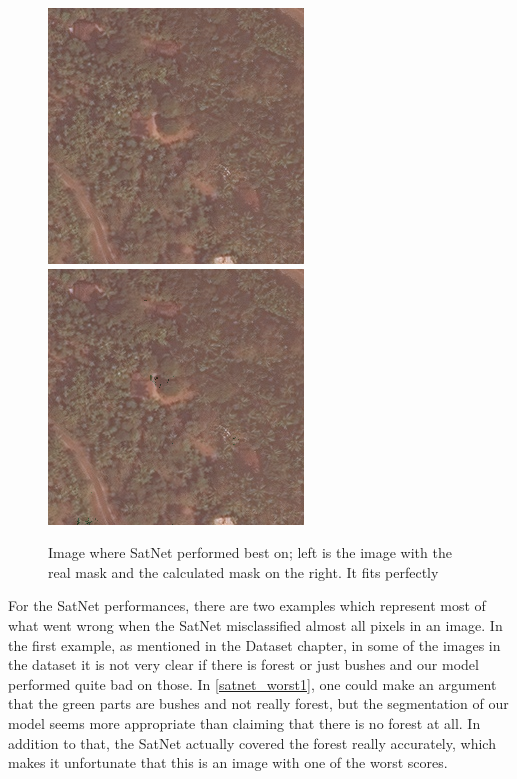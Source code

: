 \begin{figure}[!h]
  \begin{center}
  \label{satnet_best}
  \includegraphics[width=.4\linewidth]{images/satellite_images/sat_best_real}
  \includegraphics[width=.4\linewidth]{images/satellite_images/sat_best_calc}
  \caption{Image where SatNet performed best on; left is the image with the real mask and the calculated mask on the right. It fits perfectly}
  \end{center}
\end{figure}

For the SatNet performances, there are two examples which represent most of what went wrong when the SatNet misclassified almost all pixels in an image. In the first example, as mentioned in the Dataset chapter, in some of the images in the dataset it is not very clear if there is forest or just bushes and our model performed quite bad on those. In \ref{satnet_worst1}, one could make an argument that the green parts are bushes and not really forest, but the segmentation of our model seems more appropriate than claiming that there is no forest at all. In addition to that, the SatNet actually covered the forest really accurately, which makes it unfortunate that this is an image with one of the worst scores.

